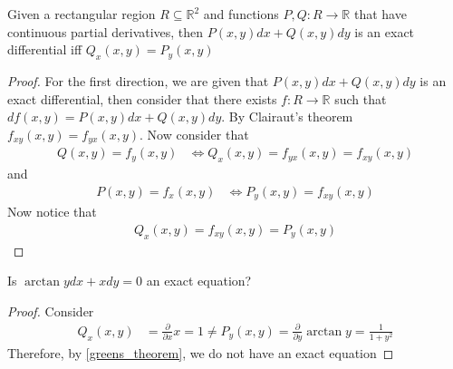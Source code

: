 \documentclass[notes]{subfiles}
\begin{document}
\begin{theorem} \label{greens_theorem}
    Given a rectangular region $R \subseteq \mathbb{R}^2$ and functions $P, Q\colon R \to \mathbb{R}$ that have continuous partial derivatives, then $P(x, y)dx + Q(x, y)dy$ is an exact differential iff $Q_x(x, y) = P_y(x, y)$
\end{theorem}
\begin{proof}
    For the first direction, we are given that $P(x, y)dx + Q(x, y)dy$ is an exact differential, then consider that there exists $f\colon R \to \mathbb{R}$ such that $df(x, y) = P(x, y)dx + Q(x, y)dy$. By Clairaut's theorem $f_{xy}(x, y) = f_{yx}(x, y)$. Now consider that
    \begin{align*}
        Q(x, y) = f_y(x, y)
        &\iff Q_x(x, y) = f_{yx}(x, y) = f_{xy}(x, y)
    \end{align*}
    and
    \begin{align*}
        P(x, y) = f_x(x, y)
        &\iff P_y(x, y) = f_{xy}(x, y)
    \end{align*}
    Now notice that
    \begin{align*}
        Q_x(x, y) = f_{xy}(x, y) = P_y(x, y)
    \end{align*}
\end{proof}

\begin{exercise}
    Is $\arctan y dx + x dy = 0$ an exact equation?
\end{exercise}
\begin{proof}
    Consider
    \begin{align*}
        Q_x(x, y)
        &= \frac{\partial}{\partial x} x
        = 1
        \neq P_y(x, y)
        = \frac{\partial}{\partial y} \arctan y
        = \frac{1}{1 + y^2}
    \end{align*}
    Therefore, by \cref{greens_theorem}, we do not have an exact equation
\end{proof}
\end{document}
